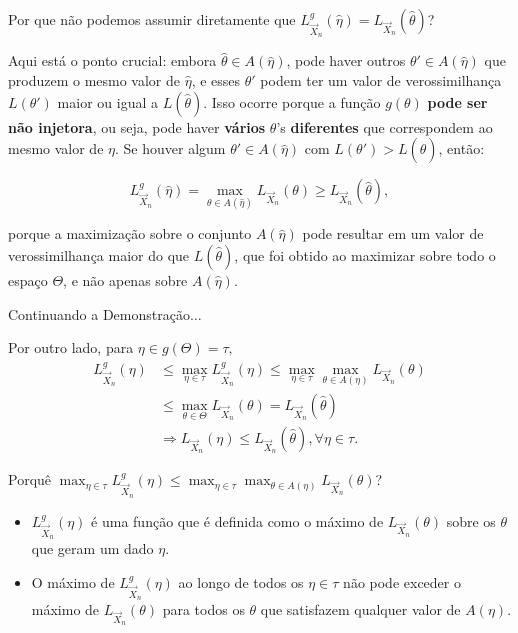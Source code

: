 \documentclass[12pt]{beamer}
\begin{document}
\begin{frame}{Por que não podemos assumir diretamente que \( L_{\vec{X}_n}^{g}(\hat{\eta}) = L_{\vec{X}_n}(\hat{\theta}) \)?}
	\begin{block}{}
		\justifying
		Aqui está o ponto crucial: embora \( \hat{\theta} \in A(\hat{\eta}) \), pode haver outros \( \theta' \in A(\hat{\eta}) \) que produzem o mesmo valor de \( \hat{\eta} \), e esses \( \theta' \) podem ter um valor de verossimilhança \( L(\theta') \) maior ou igual a \( L(\hat{\theta}) \). Isso ocorre porque a função \( g(\theta) \) \textbf{pode ser não injetora}, ou seja, pode haver \textbf{vários} \( \theta \)'s \textbf{diferentes} que correspondem ao mesmo valor de \( \eta \). Se houver algum \( \theta' \in A(\hat{\eta}) \) com \( L(\theta') > L(\hat{\theta}) \), então:
		
		\[
		L_{\vec{X}_n}^{g}(\hat{\eta}) = \max_{\theta \in A(\hat{\eta})} L_{\vec{X}_n}(\theta) \geq L_{\vec{X}_n}(\hat{\theta}),
		\]
		
		porque a maximização sobre o conjunto \( A(\hat{\eta}) \) pode resultar em um valor de verossimilhança maior do que \( L(\hat{\theta}) \), que foi obtido ao maximizar sobre todo o espaço \( \Theta \), e não apenas sobre \( A(\hat{\eta}) \).
		
	\end{block}
\end{frame}

\begin{frame}{Continuando a Demonstração$\ldots$}
	\begin{block}{}
		\justifying
		Por outro lado, para $\eta\in g(\Theta)=\tau,$
		\begin{align*}
			L_{\vec{X}_{n}}^{g}(\eta)&\leq {\displaystyle \max_{\eta\in \tau}L_{\vec{X}_{n}}^{g}(\eta)}\leq \max_{\eta\in\tau}\max_{\theta\in A(\eta)}L_{\vec{X}_{n}}(\theta)\\
			&\leq \max_{\theta\in \Theta}L_{\vec{X}_{n}}(\theta)=L_{\vec{X}_{n}}(\hat{\theta})\\
			&\Rightarrow L_{\vec{X}_{n}}(\eta)\leq L_{\vec{X}_{n}}(\hat{\theta}), \forall \eta\in\tau.
		\end{align*}
	\end{block}
	\pause
	\begin{block}{Porquê ${\displaystyle \max_{\eta\in \tau}L_{\vec{X}_{n}}^{g}(\eta)}\leq \max_{\eta\in\tau}\max_{\theta\in A(\eta)}L_{\vec{X}_{n}}(\theta)$?}
		\begin{itemize}
			\justifying
			\item \( L_{\vec{X}_{n}}^{g}(\eta) \) é uma função que é definida como o máximo de \( L_{\vec{X}_{n}}(\theta) \) sobre os \( \theta \) que geram um dado \( \eta \).\pause
			\item O máximo de \( L_{\vec{X}_{n}}^{g}(\eta) \) ao longo de todos os \( \eta \in \tau \) não pode exceder o máximo de \( L_{\vec{X}_{n}}(\theta) \) para todos os \( \theta \) que satisfazem qualquer valor de \( A(\eta) \).
		\end{itemize}
	\end{block}
\end{frame}
\end{document}
